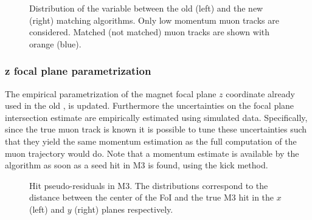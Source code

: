 \begin{figure}[t]
  \centering
  \begin{subfigure}{0.5\textwidth}
    \raggedright
    \scalebox{.6}{}
    \caption{}
    \label{mvTTm_chi2}
  \end{subfigure}%
  \hfill%
  \begin{subfigure}{0.5\textwidth}
    \raggedleft
    \scalebox{.6}{}
    \caption{}
    \label{mvm_chi2}
  \end{subfigure}
  \caption{Distribution of the \chisq variable between the old (left) and the new (right) matching algorithms.
           Only low momentum muon tracks are considered. Matched (not matched) muon tracks are shown with orange (blue).}
 \label{mvm_chi2_comp}
\end{figure}

\subsubsection{z focal plane parametrization}
The empirical parametrization of the magnet focal plane $z$ coordinate already used in the old \mvm \cite{roelThesis},
is updated. Furthermore the uncertainties on the focal plane intersection estimate are empirically estimated using simulated data.
Specifically, since the true muon track is known it is possible to tune these uncertainties such that they yield the same momentum
estimation as the full computation of the muon trajectory would do. Note that a momentum estimate is available by the
\mvTTm algorithm as soon as a seed hit in M3 is found, using the kick method.

\begin{figure}[t]
  \centering
  \begin{subfigure}{0.5\textwidth}
    \raggedright
    \scalebox{.6}{}
    \caption{}
    \label{mvTTm_res_x}
  \end{subfigure}%
  \hfill%
  \begin{subfigure}{0.5\textwidth}
    \raggedleft
    \scalebox{.6}{}
    \caption{}
    \label{mvm_res_y}
  \end{subfigure}
  \caption{Hit pseudo-residuals in M3. The distributions correspond to the distance between the center of the FoI and the true M3 hit
           in the $x$ (left) and $y$ (right) planes respectively.}
 \label{mvm_res}
\end{figure}

